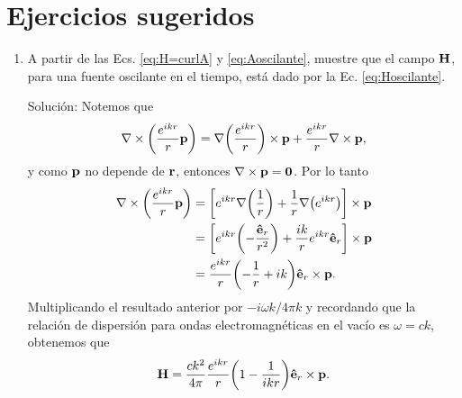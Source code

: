 
\section{Ejercicios sugeridos}

\begin{enumerate}[label=\textbf{Ejercicio \thechapter.\arabic*},resume]
\item A partir de las Ecs. \eqref{eq:H=curlA} y \eqref{eq:Aoscilante}, muestre que el campo $\vb{H}$, para una fuente oscilante en el tiempo, está dado por la Ec. \eqref{eq:Hoscilante}.
\label{ex:Hoscilante}
\item[\color{blue} Solución:]
	Notemos que
	\begin{align*}
	\nabla\times\qty(\frac{e^{ikr}}{r}\vb{p}) = \nabla\qty(\frac{e^{ikr}}{r})\times\vb{p} + \frac{e^{ikr}}{r}\nabla\times\vb{p},
\end{align*}		
y como $\vb{p}$ no depende de $\vb{r}$, entonces $\nabla\times\vb{p} = \vb{0}$. Por lo tanto
\begin{align*}
\nabla\times\qty(\frac{e^{ikr}}{r}\vb{p}) 
	 &= \qty[e^{ikr}\nabla\qty(\frac{1}{r})+\frac{1}{r}\nabla\qty(e^{ikr})]\times\vb{p}\\
	 &= \qty[e^{ikr}\qty(-\frac{\vu{e}_r}{r^2})+\frac{ik}{r}e^{ikr}\vu{e}_r] \times\vb{p}\\
	 &= \frac{e^{ikr}}{r}\qty(-\frac{1}{r}+ik)\vu{e}_r\times\vb{p}.
\end{align*}
Multiplicando el resultado anterior por $-i\omega k/4\pi k$ y recordando que la relación de dispersión para ondas electromagnéticas en el vacío es $\omega =  ck$,  obtenemos que
	\begin{align*}
	\vb{H} = \frac{ck^2}{4\pi}\frac{e^{ikr}}{r}\qty(1-\frac{1}{ikr})\vu{e}_r\times\vb{p}.
	\end{align*}
	

\end{enumerate}
